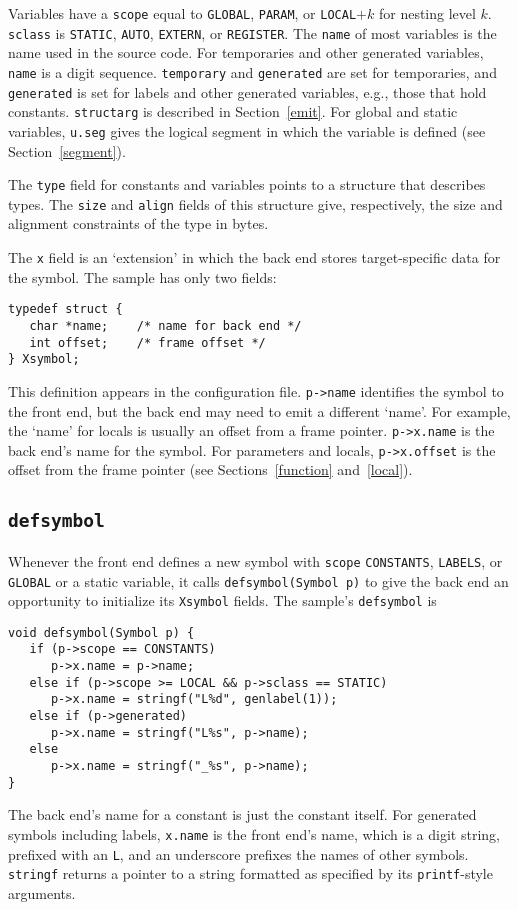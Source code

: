 Variables have a \verb|scope| equal to \verb|GLOBAL|, \verb|PARAM|,
or \verb|LOCAL|$+k$ for nesting level $k$.
\verb|sclass| is \verb|STATIC|, \verb|AUTO|, \verb|EXTERN|, or \verb|REGISTER|.
The \verb|name| of most variables is the name used in the source code.
For temporaries and other generated variables, \verb|name| is a digit sequence.
\verb|temporary| and \verb|generated| are set for temporaries,
and \verb|generated| is set for labels and other generated variables, e.g., those
that hold constants.
\verb|structarg| is described in Section~\ref{emit}.
For global and static variables,
\verb|u.seg| gives the logical segment in which the variable is defined
(see Section~\ref{segment}).

The \verb|type| field for constants and variables points to
a structure that describes types. The \verb|size| and \verb|align|
fields of this structure give, respectively, the size and alignment constraints
of the type in bytes.

The \verb|x| field is an `extension' in which the back end stores
target-specific data for the symbol.
The sample has only two fields:
\begin{verbatim}
typedef struct {
   char *name;    /* name for back end */
   int offset;    /* frame offset */
} Xsymbol;
\end{verbatim}
This definition appears in the configuration file.
\verb|p->name| identifies the symbol to the front end, but the back end
may need to emit a different `name'. For example,
the `name' for locals is usually an offset from a frame pointer.
\verb|p->x.name| is the back end's name for the symbol.
For parameters and locals, \verb|p->x.offset| is the
offset from the frame pointer (see Sections~\ref{function} and~\ref{local}).

\subsection{\tt defsymbol}

\label{defsymbol}
Whenever the front end defines a new symbol with
\verb|scope| \verb|CONSTANTS|, \verb|LABELS|, or \verb|GLOBAL|
or a static variable, it calls
\verb|defsymbol(Symbol p)| to give the back end an opportunity to initialize
its \verb|Xsymbol| fields. The sample's \verb|defsymbol| is
\begin{verbatim}
void defsymbol(Symbol p) {
   if (p->scope == CONSTANTS)
      p->x.name = p->name;
   else if (p->scope >= LOCAL && p->sclass == STATIC)
      p->x.name = stringf("L%d", genlabel(1));
   else if (p->generated)
      p->x.name = stringf("L%s", p->name);
   else
      p->x.name = stringf("_%s", p->name);
}
\end{verbatim}
The back end's name for a constant is just the constant itself.
For generated symbols including labels, \verb|x.name| is the front end's name,
which is a digit string, prefixed with an \verb|L|,
and an underscore prefixes the names of other symbols.
\verb|stringf| returns a pointer to a string formatted as specified
by its \verb|printf|-style arguments.


